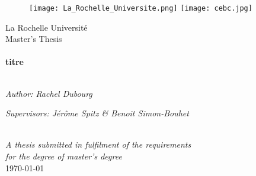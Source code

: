 \begin{titlepage}

\begin{figure}[ht]
			\texttt{[image: La\_Rochelle\_Universite.png]}
			\label{logoLR}
	   \endminipage
			\texttt{[image: cebc.jpg]}
			\label{logocebc}
		\endminipage
	\end{figure}


\begin{center}

{\LARGE La Rochelle Université}\\[1.5cm] %
{\Large Master's Thesis}\\[0.5cm] %

\HRule \\[0.4cm] %
{\huge \bfseries titre}\\[0.4cm] %
\HRule \\[1.5cm] %

\begin{minipage}{0.4\textwidth}
\begin{flushleft} \large
\emph{Author: Rachel Dubourg}\\
\end{flushleft}
\end{minipage}
\begin{minipage}{0.4\textwidth}
\begin{flushright} \large
\emph{Supervisors: Jérôme Spitz \& Benoit Simon-Bouhet} \\
\end{flushright}
\end{minipage}\\[3cm]

\large \textit{A thesis submitted in fulfilment of the requirements\\ for the degree of master's degree}\\[0.3cm] %

{\large \today}\\[4cm]



\end{center}
\end{titlepage}
